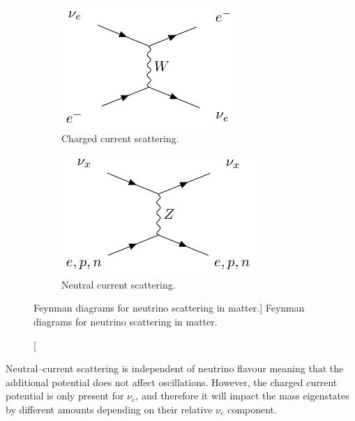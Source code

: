 {\begin{figure}
	\begin{subfigure}[b]{0.49\textwidth}
		\includegraphics[width=\textwidth]{latex_extras/ne_cc.pdf}
		\caption{Charged current scattering.}
		\label{fig:nu_cc}
	\end{subfigure}
	\hfill
	\begin{subfigure}[b]{0.49\textwidth}
		\includegraphics[width=\textwidth]{latex_extras/n_nc.pdf}
		\caption{Neutral current scattering.}
		\label{fig:nu_nc}
	\end{subfigure}

	\caption
	[Feynman diagrams for neutrino scattering in matter.]
	{Feynman diagrams for neutrino scattering in matter.}

	\label{fig:nu_in_matter}
\end{figure}

Neutral--current scattering is independent of neutrino flavour meaning that
the additional potential does not affect oscillations. However, the charged
current potential is only present for $\nu_e$, and therefore it will impact the
mass eigenstates by different amounts depending on their relative $\nu_e$
component.

}
